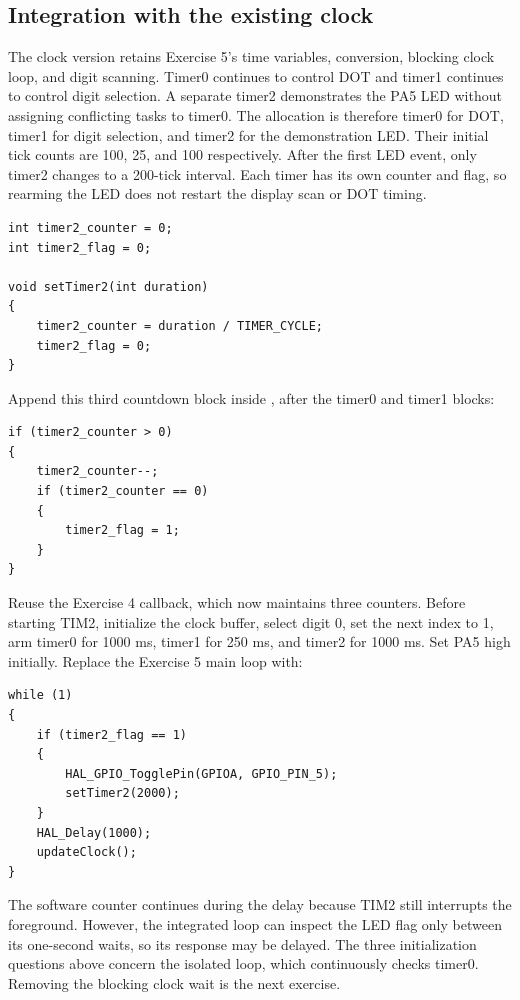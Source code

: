 \documentclass[a4paper]{article}
\newcommand{\code}[1]{\texttt{\detokenize{#1}}}
\newcommand{\topic}[1]{\subsection{#1}}
\begin{document}
\topic{Integration with the existing clock}
The clock version retains Exercise 5's time variables, conversion, blocking
clock loop, and digit scanning. Timer0 continues to control DOT and timer1
continues to control digit selection. A separate timer2 demonstrates the PA5
LED without assigning conflicting tasks to timer0.
The allocation is therefore timer0 for DOT, timer1 for digit selection, and
timer2 for the demonstration LED. Their initial tick counts are 100, 25, and
100 respectively. After the first LED event, only timer2 changes to a
200-tick interval. Each timer has its own counter and flag, so rearming the
LED does not restart the display scan or DOT timing.
\par\noindent\begin{minipage}{\linewidth}
\begin{lstlisting}[caption={Additional timer for the integrated LED example}]
int timer2_counter = 0;
int timer2_flag = 0;

void setTimer2(int duration)
{
    timer2_counter = duration / TIMER_CYCLE;
    timer2_flag = 0;
}
\end{lstlisting}
\end{minipage}\par
Append this third countdown block inside \code{timer_run()}, after the timer0
and timer1 blocks:
\par\noindent\begin{minipage}{\linewidth}
\begin{lstlisting}[caption={Timer2 countdown block}]
if (timer2_counter > 0)
{
    timer2_counter--;
    if (timer2_counter == 0)
    {
        timer2_flag = 1;
    }
}
\end{lstlisting}
\end{minipage}\par
Reuse the Exercise 4 callback, which now maintains three counters. Before
starting TIM2, initialize the clock buffer, select digit 0, set the next index
to 1, arm timer0 for 1000 ms, timer1 for 250 ms, and timer2 for 1000 ms. Set PA5
high initially. Replace the Exercise 5 main loop with:
\par\noindent\begin{minipage}{\linewidth}
\begin{lstlisting}[caption={Clock retained with an independent LED timer}]
while (1)
{
    if (timer2_flag == 1)
    {
        HAL_GPIO_TogglePin(GPIOA, GPIO_PIN_5);
        setTimer2(2000);
    }
    HAL_Delay(1000);
    updateClock();
}
\end{lstlisting}
\end{minipage}\par
The software counter continues during the delay because TIM2 still interrupts
the foreground. However, the integrated loop can inspect the LED flag only
between its one-second waits, so its response may be delayed. The three
initialization questions above concern the isolated loop, which continuously
checks timer0. Removing the blocking clock wait is the next exercise.
\end{document}
